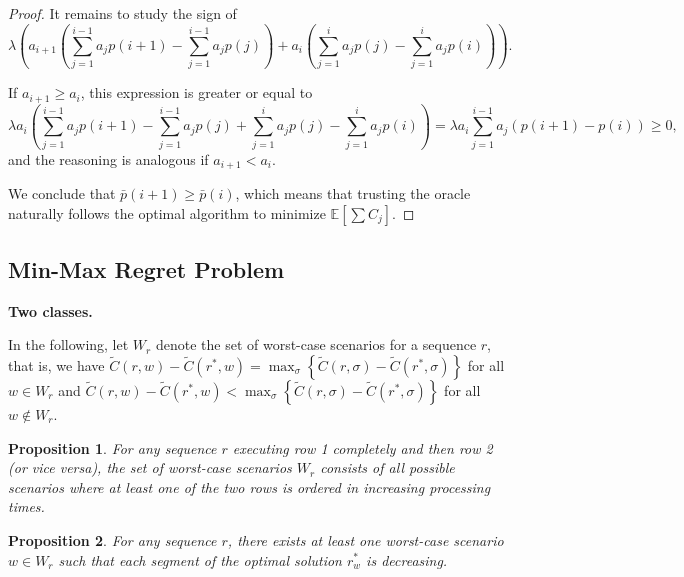 \documentclass{article}
\newtheorem{proposition}{Proposition}
\newcommand{\E}{\mathbb{E}}
\begin{document}
\begin{proof}
    It remains to study the sign of
    \[
        \lambda \left(a_{i+1}\left(\sum_{j=1}^{i-1}a_jp(i+1)-\sum_{j=1}^{i-1}a_jp(j)\right)+a_i\left(\sum_{j=1}^{i}a_jp(j)-\sum_{j=1}^{i}a_jp(i)\right)\right).
    \]

    If \(a_{i+1}\ge a_i\), this expression is greater or equal to
    \[
        \lambda a_i \left(\sum_{j=1}^{i-1}a_jp(i+1)-\sum_{j=1}^{i-1}a_jp(j)+\sum_{j=1}^{i}a_jp(j)-\sum_{j=1}^{i}a_jp(i)\right)=\lambda a_i \sum_{j=1}^{i-1} a_j(p(i+1)-p(i))\ge 0,
    \]
    and the reasoning is analogous if \(a_{i+1}<a_i\).

    We conclude that \(\bar{p}(i+1)\ge\bar{p}(i)\), which means that trusting the oracle naturally follows the optimal algorithm to minimize \(\E\left[\sum C_j\right]\).
\end{proof}

\subsection{Min-Max Regret Problem}


\noindent\textbf{Two classes.}

In the following, let \(W_r\) denote the set of worst-case scenarios for a sequence \(r\), that is, we have \(\tilde{C}(r,w)-\tilde{C}(r^*,w)=\max_{\sigma}\left\{\tilde{C}(r,\sigma)-\tilde{C}(r^*,\sigma)\right\}\) for all \(w\in W_r\) and \(\tilde{C}(r,w)-\tilde{C}(r^*,w)<\max_{\sigma}\left\{\tilde{C}(r,\sigma)-\tilde{C}(r^*,\sigma)\right\}\) for all \(w\notin W_r\).

\begin{proposition}
    For any sequence \(r\) executing row 1 completely and then row 2 (or vice versa), the set of worst-case scenarios \(W_r\) consists of all possible scenarios where at least one of the two rows is ordered in increasing processing times.
\end{proposition}

\begin{proposition}
    For any sequence \(r\), there exists at least one worst-case scenario \(w\in W_r\) such that each segment of the optimal solution \(r^*_w\) is decreasing.
\end{proposition}


\end{document}
